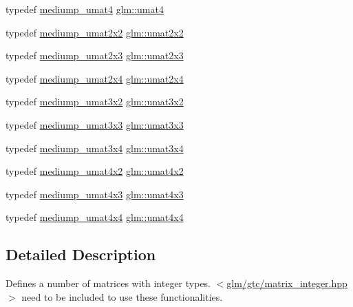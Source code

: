 \begin{DoxyCompactItemize}
\item 
typedef \hyperlink{group__gtc__matrix__integer_gac82f1c426fbca1c4989f0985eb7a4358}{mediump\+\_\+umat4} \hyperlink{group__gtc__matrix__integer_ga7ae562000d8a8d193e9f93cf51e2e113}{glm\+::umat4}
\item 
typedef \hyperlink{group__gtc__matrix__integer_ga80e478f09c6caa16410198ce78fe8a2b}{mediump\+\_\+umat2x2} \hyperlink{group__gtc__matrix__integer_gad3c997b31dd69bdb4787867e758ed48d}{glm\+::umat2x2}
\item 
typedef \hyperlink{group__gtc__matrix__integer_gaaae45c5dbaad1ecd57bfa936d851be1b}{mediump\+\_\+umat2x3} \hyperlink{group__gtc__matrix__integer_ga890ae28f9230794138b2c89f44ce3376}{glm\+::umat2x3}
\item 
typedef \hyperlink{group__gtc__matrix__integer_gaf79e9c80f024d31f3d66ddae75e90b6c}{mediump\+\_\+umat2x4} \hyperlink{group__gtc__matrix__integer_ga3b23b164240cf4dfb429776da7be9d88}{glm\+::umat2x4}
\item 
typedef \hyperlink{group__gtc__matrix__integer_ga65a9fdb1a5918fe6f308577065983e23}{mediump\+\_\+umat3x2} \hyperlink{group__gtc__matrix__integer_ga257300f2710612877ef45438a366e308}{glm\+::umat3x2}
\item 
typedef \hyperlink{group__gtc__matrix__integer_ga31a05e7b2a6a596bdc7ceeb5d9c10e1c}{mediump\+\_\+umat3x3} \hyperlink{group__gtc__matrix__integer_gab80b6501ba1b2c40119a0f2d256f4c97}{glm\+::umat3x3}
\item 
typedef \hyperlink{group__gtc__matrix__integer_ga8113e067e1f327fac64cf9015c8c5431}{mediump\+\_\+umat3x4} \hyperlink{group__gtc__matrix__integer_ga5410857d098a989a30b4017100bc2ff7}{glm\+::umat3x4}
\item 
typedef \hyperlink{group__gtc__matrix__integer_ga8ea45737e8bc9bfae2668968056b109f}{mediump\+\_\+umat4x2} \hyperlink{group__gtc__matrix__integer_ga13e8392218e9b6e1b7f194a21b5c88bf}{glm\+::umat4x2}
\item 
typedef \hyperlink{group__gtc__matrix__integer_gaebe3b1b4b6030c096447e40fb00528f4}{mediump\+\_\+umat4x3} \hyperlink{group__gtc__matrix__integer_ga08373f5588a54da1a48e5e55c7d51004}{glm\+::umat4x3}
\item 
typedef \hyperlink{group__gtc__matrix__integer_ga24b1c76fefa58f810e24cafe0ea6a6a0}{mediump\+\_\+umat4x4} \hyperlink{group__gtc__matrix__integer_gae0931b79e808fb0983848778a60eb548}{glm\+::umat4x4}
\end{DoxyCompactItemize}


\subsection{Detailed Description}
Defines a number of matrices with integer types. $<$\hyperlink{matrix__integer_8hpp}{glm/gtc/matrix\+\_\+integer.\+hpp}$>$ need to be included to use these functionalities. 

